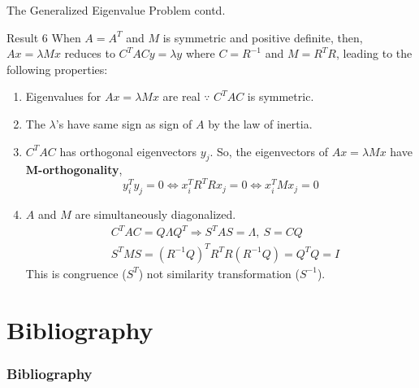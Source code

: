 \documentclass{beamer}
\begin{document}
\begin{frame}{The Generalized Eigenvalue Problem contd.}
\begin{block}{Result 6}
When $A=A^T$ and $M$ is symmetric and positive definite, then, $Ax = \lambda Mx$ reduces to $C^TAC y = \lambda y$ where $C = R^{-1}$ and $M = R^TR$, leading to the following properties:
\begin{enumerate}
    \item {
        Eigenvalues for $Ax=\lambda Mx$ are real $\because$ $C^TAC$ is symmetric.
    }
    \item {
        The $\lambda$'s have same sign as sign of $A$ by the law of inertia.
    }
    \item {
        $C^TAC$ has orthogonal eigenvectors $y_j$. So, the eigenvectors of $Ax = \lambda Mx$ have $\mathbf{M}$\textbf{-orthogonality},
        \begin{equation*}
            y_i^Ty_j = 0 \iff x_i^TR^TRx_j = 0 \iff x_i^TMx_j = 0
        \end{equation*}
    }
    \item {
        $A$ and $M$ are simultaneously diagonalized.
        \begin{align*}
            &C^TAC = Q\Lambda Q^T \Rightarrow S^TAS = \Lambda, \ S = CQ\\
            &S^TMS = (R^{-1}Q)^TR^TR(R^{-1}Q) = Q^TQ = I
        \end{align*}
        \small{This is congruence ($S^T$) not similarity transformation ($S^{-1}$)}.
    }
\end{enumerate}
\end{block}
\end{frame}


\section{Bibliography}
\begin{frame}[t]
    \frametitle{Bibliography}
    \nocite{*}
    \printbibliography
\end{frame}
\end{document}
